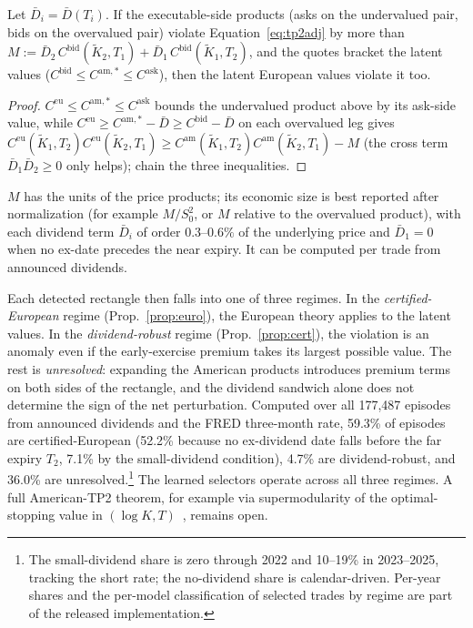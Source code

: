 \documentclass[sigconf,review]{acmart}
\begin{document}
\begin{proposition}\label{prop:cert}
Let $\bar D_i=\bar D(T_i)$. If the executable-side products (asks on the undervalued pair, bids on the overvalued pair) violate Equation~\eqref{eq:tp2adj} by more than $M:=\bar D_2\,C^{\mathrm{bid}}(\tilde K_2,T_1)+\bar D_1\,C^{\mathrm{bid}}(\tilde K_1,T_2)$, and the quotes bracket the latent values ($C^{\mathrm{bid}}\le C^{\mathrm{am},*}\le C^{\mathrm{ask}}$), then the latent European values violate it too.
\end{proposition}
\begin{proof}
$C^{\mathrm{eu}}\!\le\!C^{\mathrm{am},*}\!\le\!C^{\mathrm{ask}}$ bounds the undervalued product above by its ask-side value, while $C^{\mathrm{eu}}\!\ge\!C^{\mathrm{am},*}-\bar D\ge C^{\mathrm{bid}}-\bar D$ on each overvalued leg gives $C^{\mathrm{eu}}(\tilde K_1,T_2)C^{\mathrm{eu}}(\tilde K_2,T_1)\ge C^{\mathrm{am}}(\tilde K_1,T_2)C^{\mathrm{am}}(\tilde K_2,T_1)-M$ (the cross term $\bar D_1\bar D_2\ge0$ only helps); chain the three inequalities.
\end{proof}
\noindent $M$ has the units of the price products; its economic size is best reported after normalization (for example $M/S_0^2$, or $M$ relative to the overvalued product), with each dividend term $\bar D_i$ of order $0.3$--$0.6\%$ of the underlying price and $\bar D_1=0$ when no ex-date precedes the near expiry. It can be computed per trade from announced dividends.

Each detected rectangle then falls into one of three regimes. In the \emph{certified-European} regime (Prop.~\ref{prop:euro}), the European theory applies to the latent values. In the \emph{dividend-robust} regime (Prop.~\ref{prop:cert}), the violation is an anomaly even if the early-exercise premium takes its largest possible value. The rest is \emph{unresolved}: expanding the American products introduces premium terms on both sides of the rectangle, and the dividend sandwich alone does not determine the sign of the net perturbation. Computed over all 177{,}487 episodes from announced dividends and the FRED three-month rate, 59.3\% of episodes are certified-European (52.2\% because no ex-dividend date falls before the far expiry $T_2$, 7.1\% by the small-dividend condition), 4.7\% are dividend-robust, and 36.0\% are unresolved.\footnote{The small-dividend share is zero through 2022 and 10--19\% in 2023--2025, tracking the short rate; the no-dividend share is calendar-driven. Per-year shares and the per-model classification of selected trades by regime are part of the released implementation.} The learned selectors operate across all three regimes. A full American-TP2 theorem, for example via supermodularity of the optimal-stopping value in $(\log K,T)$~\cite{topkis1998}, remains open.
\end{document}

